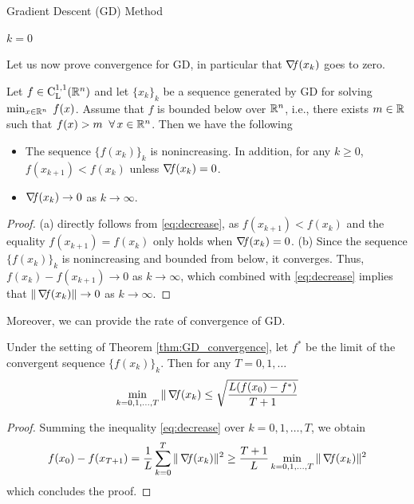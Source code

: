 \documentclass[10pt,a4paper]{article}
\begin{document}
\begin{algorithm}[H]\label{gd}
	\caption{Gradient Descent (GD) Method}
	
	
	$k = 0$
	
\end{algorithm}
\noindent Let us now prove convergence for GD, in particular that $\operatorname*{\mathit{\nabla \!f}}(x_k)$ goes to zero.
\begin{theorem}[Convergence of GD]\label{thm:GD_convergence}
	Let $f\in \mathord{\mathrm{C^{1,1}_{L}}}(\mathbb{R}^n)$ and let $\{x_k\}_k$ be a sequence generated by GD for solving $\min_{x\in\mathbb{R}^n}\;f(x)$. Assume that $f$ is bounded below over $\mathbb{R}^n$, i.e., there exists $m\in \mathbb{R}$ such that $f(x)>m \;\; \forall\, x\in \mathbb{R}^n$. Then we have the following
	\begin{itemize}
		\item[(a)] The sequence $\{f(x_k)\}_k$ is nonincreasing. In addition, for any $k\geq 0$, $f(x_{k+1}) < f(x_k)$ unless $\operatorname*{\mathit{\nabla \!f}}(x_k)=0$.
		\item[(b)] $\operatorname*{\mathit{\nabla \!f}}(x_k) \to 0$ as $k\to \infty$.
	\end{itemize}
\begin{proof}
	(a) directly follows from \eqref{eq:decrease}, as $f(x_{k+1}) < f(x_k)$ and the equality $f(x_{k+1}) = f(x_k)$ only holds when $\operatorname*{\mathit{\nabla \!f}}(x_k)=0$.
	(b) Since the sequence $\{f(x_k)\}_k$ is nonincreasing and bounded from below, it converges. Thus, $f(x_k) - f(x_{k+1}) \to 0$ as $k\to \infty$, which combined with \eqref{eq:decrease} implies that $\|\operatorname*{\mathit{\nabla \!f}}(x_k)\|\to 0$ as $k\to \infty$.  
\end{proof}
\end{theorem}
\noindent Moreover, we can provide the rate of convergence of GD.
\begin{theorem}
	Under the setting of Theorem \ref{thm:GD_convergence}, let $f^*$ be the limit of the convergent sequence $\{f(x_k)\}_k$. Then for any $T=0,1, \dots$
	\begin{equation*}
		\min_{k=0,1,\dots, T} \| \operatorname*{\mathit{\nabla \!f}}(x_k) \leq \sqrt{\frac{L (f(x_0) -f^*)}{T+1}}
	\end{equation*}
\end{theorem}
\begin{proof}
	Summing the inequality \eqref{eq:decrease} over $k=0, 1, \dots, T$, we obtain 
	\begin{equation*}
		f(x_0) - f(x_{T+1}) = \frac{1}{L}\sum_{k=0}^{T} \|\operatorname*{\mathit{\nabla \!f}}(x_k)\|^2\geq \frac{T+1}{L} \min_{k=0,1,\dots, T} \| \operatorname*{\mathit{\nabla \!f}}(x_k)\|^2
	\end{equation*}
which concludes the proof.
\end{proof}
%
%
\end{document}
